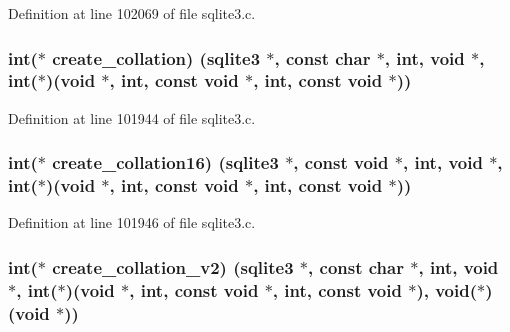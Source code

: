 Definition at line 102069 of file sqlite3.\+c.

\hypertarget{structsqlite3__api__routines_aba03b11b6904d9c6796bb4ada1a0adbe}{}
\subsubsection[{create\+\_\+collation}]{\setlength{\rightskip}{0pt plus 5cm}int($\ast$ create\+\_\+collation) ({\bf sqlite3} $\ast$, const char $\ast$, int, void $\ast$, int($\ast$)(void $\ast$, int, const void $\ast$, int, const void $\ast$))}\label{structsqlite3__api__routines_aba03b11b6904d9c6796bb4ada1a0adbe}


Definition at line 101944 of file sqlite3.\+c.

\hypertarget{structsqlite3__api__routines_a2a103db00b3e96982f961473802801f3}{}
\subsubsection[{create\+\_\+collation16}]{\setlength{\rightskip}{0pt plus 5cm}int($\ast$ create\+\_\+collation16) ({\bf sqlite3} $\ast$, const void $\ast$, int, void $\ast$, int($\ast$)(void $\ast$, int, const void $\ast$, int, const void $\ast$))}\label{structsqlite3__api__routines_a2a103db00b3e96982f961473802801f3}


Definition at line 101946 of file sqlite3.\+c.

\hypertarget{structsqlite3__api__routines_af08608f15c694b8f19f4ad8b7c82e43f}{}
\subsubsection[{create\+\_\+collation\+\_\+v2}]{\setlength{\rightskip}{0pt plus 5cm}int($\ast$ create\+\_\+collation\+\_\+v2) ({\bf sqlite3} $\ast$, const char $\ast$, int, void $\ast$, int($\ast$)(void $\ast$, int, const void $\ast$, int, const void $\ast$), void($\ast$)(void $\ast$))}\label{structsqlite3__api__routines_af08608f15c694b8f19f4ad8b7c82e43f}


